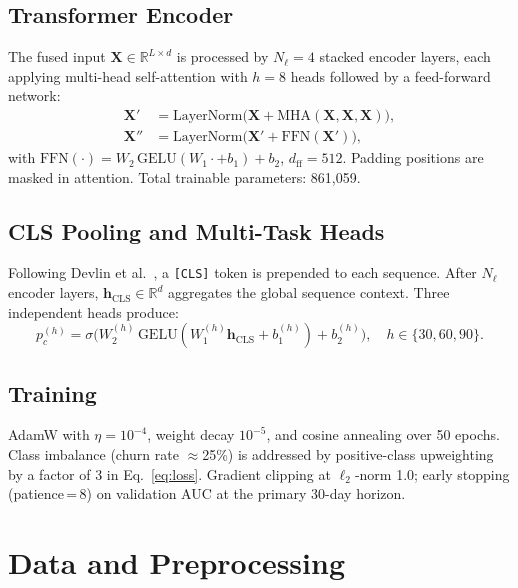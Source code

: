 \documentclass[review, 12pt]{elsarticle}
\newcommand{\R}{\mathbb{R}}
\begin{document}
\subsection{Transformer Encoder}

The fused input $\mathbf{X} \in \R^{L \times d}$ is processed by $N_\ell = 4$
stacked encoder layers, each applying multi-head self-attention
\cite{vaswani2017} with $h = 8$ heads followed by a feed-forward network:
\begin{align}
  \mathbf{X}'  &= \text{LayerNorm}\bigl(\mathbf{X} +
    \text{MHA}(\mathbf{X},\mathbf{X},\mathbf{X})\bigr), \\
  \mathbf{X}'' &= \text{LayerNorm}\bigl(\mathbf{X}' + \text{FFN}(\mathbf{X}')\bigr),
  \label{eq:encoder}
\end{align}
with $\text{FFN}(\cdot) = W_2\,\text{GELU}(W_1\cdot + b_1) + b_2$,
$d_{\text{ff}} = 512$.
Padding positions are masked in attention.
Total trainable parameters: 861{,}059.

\subsection{CLS Pooling and Multi-Task Heads}
\label{sec:heads}

Following Devlin et al.\ \cite{devlin2019}, a \texttt{[CLS]} token is prepended
to each sequence.
After $N_\ell$ encoder layers, $\mathbf{h}_{\text{CLS}} \in \R^d$ aggregates
the global sequence context.
Three independent heads produce:
\begin{equation}
  p_c^{(h)} = \sigma\!\bigl(
    W_2^{(h)}\,\text{GELU}(W_1^{(h)}\mathbf{h}_{\text{CLS}} + b_1^{(h)})
    + b_2^{(h)}\bigr),
  \quad h \in \{30,60,90\}.
  \label{eq:heads}
\end{equation}

\subsection{Training}
\label{sec:training}

AdamW \cite{loshchilov2019} with $\eta = 10^{-4}$, weight decay $10^{-5}$,
and cosine annealing over 50 epochs.
Class imbalance (churn rate $\approx$25\%) is addressed by positive-class
upweighting by a factor of 3 in Eq.~\eqref{eq:loss}.
Gradient clipping at $\ell_2$-norm 1.0; early stopping (patience\,=\,8)
on validation AUC at the primary 30-day horizon.

\section{Data and Preprocessing}
\label{sec:data}
\end{document}

